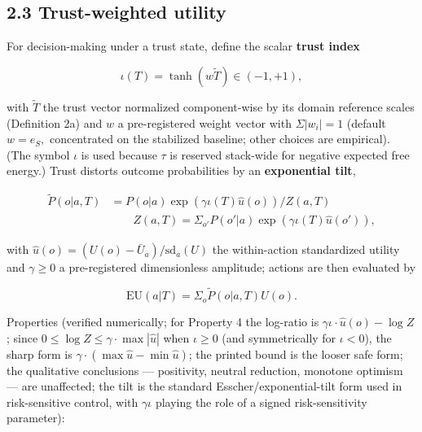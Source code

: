 \documentclass[11pt,twocolumn]{article}
\theoremstyle{gttdef}
\theoremstyle{gttplain}
\begin{document}
\subsection*{2.3 Trust-weighted utility}

For decision-making under a trust state, define the scalar \textbf{trust index}

\begin{equation}
\iota(T) = \tanh(w \tilde{T}) \in (-1, +1),
\label{eq:iota}
\end{equation}

with $\tilde{T}$ the trust vector normalized component-wise by its domain reference scales (Definition 2a) and $w$ a pre-registered weight vector with $\Sigma|w_i| = 1$ (default $w = e_S,$ concentrated on the stabilized baseline; other choices are empirical). (The symbol $\iota$ is used because $\tau$ is reserved stack-wide for negative expected free energy.) Trust distorts outcome probabilities by an \textbf{exponential tilt},

\begin{equation}
\begin{split}
\tilde{P}(o|a, T) &= P(o|a) \exp(\gamma \iota(T) \hat{u}(o)) / Z(a, T)\\
&\qquad Z(a, T) = \Sigma_{o'} P(o'|a) \exp(\gamma \iota(T) \hat{u}(o')),
\end{split}
\label{eq:tilt}
\end{equation}

with $\hat{u}(o) = (U(o) - \bar{U}_a)/\mathrm{sd}_a(U)$ the within-action standardized utility and $\gamma \geq 0$ a pre-registered dimensionless amplitude; actions are then evaluated by

\begin{equation}
\mathrm{EU}(a | T) = \Sigma_o \tilde{P}(o|a, T) U(o).
\label{eq:eu}
\end{equation}

Properties (verified numerically; for Property 4 the log-ratio is $\gamma\iota\cdot\hat{u}(o) - \log Z$; since $0 \leq \log Z \leq \gamma\cdot\max|\hat{u}|$ when $\iota \geq 0$ (and symmetrically for $\iota < 0$), the sharp form is $\gamma\cdot(\max\hat{u} - \min\hat{u})$; the printed bound is the looser safe form; the qualitative conclusions --- positivity, neutral reduction, monotone optimism --- are unaffected; the tilt is the standard Esscher/exponential-tilt form used in risk-sensitive control, with $\gamma \iota$ playing the role of a signed risk-sensitivity parameter):
\end{document}
